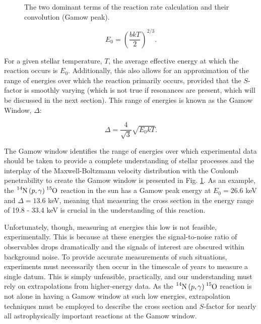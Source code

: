 \begin{figure}
\label{fig: Gamow Peak}
\caption{The two dominant terms of the reaction rate calculation and their convolution (Gamow peak). }
\end{figure}

\begin{equation}
E_{0} = \left( \dfrac{b k T}{2}  \right)^{2/3}. 
\label{eqn: GamowPeak}
\end{equation}

\noindent For a given stellar temperature, $T$, the average effective energy at which the reaction occurs is $E_{0}$. Additionally, this also allows for an approximation of the range of energies over which the reaction primarily occurs, provided that the $S$-factor is smoothly varying (which is not true if resonances are present, which will be discussed in the next section). This range of energies is known as the Gamow Window, $\Delta$:

\begin{equation}
\Delta = \dfrac{4}{\sqrt{3}} \sqrt{E_{0} k T}.
\label{eqn: Gamow window width}
\end{equation}

\noindent The Gamow window identifies the range of energies over which experimental data should be taken to provide a complete understanding of stellar processes and the interplay of the Maxwell-Boltzmann velocity distribution with the Coulomb penetrability to create the Gamow window is presented in Fig. \ref{fig: Gamow Peak}. As an example, the $\ce{^{14}N} \left( p, \gamma \right) \ce{^{15}O}$ reaction in the sun has a Gamow peak energy at $E_{0} = 26.6$ keV and $\Delta = 13.6$ keV, meaning that measuring the cross section in the energy range of 19.8 - 33.4 keV is crucial in the understanding of this reaction. 

Unfortunately, though, measuring at energies this low is not feasible, experimentally. This is because at these energies the signal-to-noise ratio of observables drops dramatically and the signals of interest are obscured within background noise. To provide accurate measurements of such situations, experiments must necessarily then occur in the timescale of years to measure a single datum. This is simply unfeasible, practically, and our understanding must rely on extrapolations from higher-energy data. As the $\ce{^{14}N} \left( p, \gamma \right) \ce{^{15}O}$ reaction is not alone in having a Gamow window at such low energies, extrapolation techniques must be employed to describe the cross section and $S$-factor for nearly all astrophysically important reactions at the Gamow window. 



